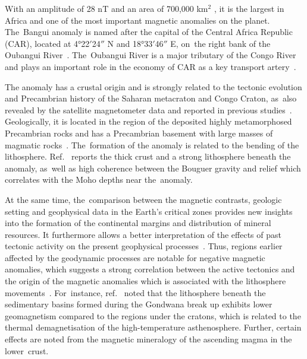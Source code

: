 \documentclass[minerals,article,accept,pdftex,moreauthors]{Definitions/mdpi}
\begin{document}
With an amplitude of 28 nT and an area of 700,000 km$^2$ \cite{girdler1992possible}, it is the largest in Africa and one of the most important magnetic anomalies on the planet. The~Bangui anomaly is named after the capital of the Central Africa Republic (CAR), located at 4°22$'$24$''$ N and 18°33$'$46$''$ E, on~the right bank of the Oubangui River~\cite{Baticle,Villien1990}. The~Oubangui River is a major tributary of the Congo River {and plays an important role in the} economy of CAR as {a key} transport artery~\cite{Vennetier}. 

{The anomaly} has a crustal origin and is strongly related to the tectonic evolution and Precambrian history of the Saharan metacraton and Congo Craton{, as~also revealed} by the satellite magnetometer data and reported in previous studies~\cite{Regan,OUABEGO201311,NJITEUTCHOUKEU2021104206}{. }Geologically, it is located in the region of the deposited highly metamorphosed Precambrian rocks and has a Precambrian basement with large masses {of magmatic} rocks~\cite{Kochemasov}. The~formation of the anomaly is {related to the bending of the lithosphere}. Ref.~\cite{NJITEUTCHOUKEU2021104299} reports the thick crust and a strong lithosphere beneath the anomaly, as~well as high coherence between the Bouguer gravity and relief which correlates with the Moho depths near the~anomaly.
 
At the same time, the~comparison between the magnetic contrasts, geologic setting and geophysical data in the Earth's critical zones provides new insights into the formation of the continental margins and distribution of mineral resources. It furthermore allows a better interpretation of the effects of past tectonic activity on the present geophysical processes~\cite{FELIXTOTEU2002906}. Thus, regions earlier affected by the geodynamic processes are notable for negative magnetic anomalies, which suggests a strong correlation between the active tectonics and the origin of the magnetic anomalies which is associated with the lithosphere movements~\cite{RAVAT199259}. For~instance, ref.~\cite{ARKANIHAMED1985257} %
noted that the lithosphere beneath the sedimentary basins formed during the Gondwana break up exhibits lower geomagnetism compared to the regions under the cratons, which is related to the thermal demagnetisation of the high-temperature asthenosphere. Further, certain effects are noted from the magnetic mineralogy of the ascending magma in the lower~crust.
\end{document}
